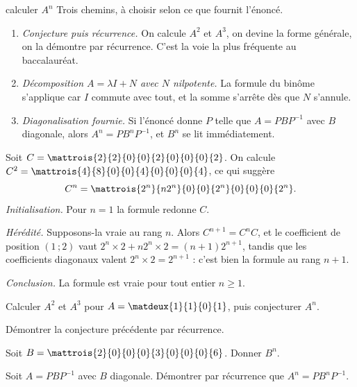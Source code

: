 \begin{methode}{calculer $A^{n}$}
Trois chemins, à choisir selon ce que fournit l'énoncé.
\begin{enumerate}[label=\textbf{\arabic*.}, leftmargin=*, itemsep=0.15em]
  \item \emph{Conjecture puis récurrence.} On calcule $A^{2}$ et $A^{3}$, on
        devine la forme générale, on la démontre par récurrence. C'est la voie
        la plus fréquente au baccalauréat.
  \item \emph{Décomposition $A = \lambda I+N$ avec $N$ nilpotente.} La formule
        du binôme s'applique car $I$ commute avec tout, et la somme s'arrête
        dès que $N$ s'annule.
  \item \emph{Diagonalisation fournie.} Si l'énoncé donne $P$ telle que
        $A = PBP^{-1}$ avec $B$ diagonale, alors $A^{n} = PB^{n}P^{-1}$, et
        $B^{n}$ se lit immédiatement.
\end{enumerate}
\end{methode}

\begin{exemple}
Soit $C = \mattrois{2}{2}{0}{0}{2}{0}{0}{0}{2}$. On calcule
$C^{2} = \mattrois{4}{8}{0}{0}{4}{0}{0}{0}{4}$, ce qui suggère
\[
  C^{n} = \mattrois{2^{n}}{n2^{n}}{0}{0}{2^{n}}{0}{0}{0}{2^{n}}.
\]
\emph{Initialisation.} Pour $n = 1$ la formule redonne $C$.

\emph{Hérédité.} Supposons-la vraie au rang $n$. Alors $C^{n+1} = C^{n}C$, et
le coefficient de position $(1\,;2)$ vaut
$2^{n}\times2+n2^{n}\times2 = (n+1)2^{n+1}$, tandis que les coefficients
diagonaux valent $2^{n}\times2 = 2^{n+1}$ : c'est bien la formule au rang
$n+1$.

\emph{Conclusion.} La formule est vraie pour tout entier $n \geq 1$.
\end{exemple}

\begin{entrainement}[puissances]
\exo[\niveau{1}] Calculer $A^{2}$ et $A^{3}$ pour
$A = \matdeux{1}{1}{0}{1}$, puis conjecturer $A^{n}$.

\exo[\niveau{2}] Démontrer la conjecture précédente par récurrence.

\exo[\niveau{2}] Soit $B = \mattrois{2}{0}{0}{0}{3}{0}{0}{0}{6}$. Donner
$B^{n}$.

\exo[\niveau{3}] Soit $A = PBP^{-1}$ avec $B$ diagonale. Démontrer par
récurrence que $A^{n} = PB^{n}P^{-1}$.
\end{entrainement}

